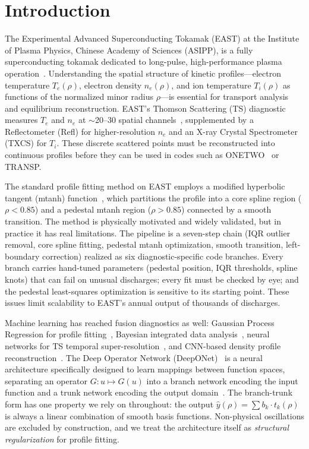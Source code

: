 \documentclass[a4paper,12pt]{article}
\begin{document}
\section{Introduction}

The Experimental Advanced Superconducting Tokamak (EAST) at the Institute of Plasma Physics, Chinese Academy of Sciences (ASIPP), is a fully superconducting tokamak dedicated to long-pulse, high-performance plasma operation~\cite{east_overview}. Understanding the spatial structure of kinetic profiles---electron temperature $T_e(\rho)$, electron density $n_e(\rho)$, and ion temperature $T_i(\rho)$ as functions of the normalized minor radius $\rho$---is essential for transport analysis and equilibrium reconstruction. EAST's Thomson Scattering (TS) diagnostic measures $T_e$ and $n_e$ at $\sim$20--30 spatial channels~\cite{east_ts,east_tvts}, supplemented by a Reflectometer (Refl) for higher-resolution $n_e$ and an X-ray Crystal Spectrometer (TXCS) for $T_i$. These discrete scattered points must be reconstructed into continuous profiles before they can be used in codes such as ONETWO~\cite{onetwo} or TRANSP.

The standard profile fitting method on EAST employs a modified hyperbolic tangent (mtanh) function~\cite{mtanh_groebner}, which partitions the profile into a core spline region ($\rho < 0.85$) and a pedestal mtanh region ($\rho > 0.85$) connected by a smooth transition. The method is physically motivated and widely validated, but in practice it has real limitations. The pipeline is a seven-step chain (IQR outlier removal, core spline fitting, pedestal mtanh optimization, smooth transition, left-boundary correction) realized as six diagnostic-specific code branches. Every branch carries hand-tuned parameters (pedestal position, IQR thresholds, spline knots) that can fail on unusual discharges; every fit must be checked by eye; and the pedestal least-squares optimization is sensitive to its starting point. These issues limit scalability to EAST's annual output of thousands of discharges.

Machine learning has reached fusion diagnostics as well: Gaussian Process Regression for profile fitting~\cite{gpr_profiles,gpr_review}, Bayesian integrated data analysis~\cite{ida_east}, neural networks for TS temporal super-resolution~\cite{diag2diag}, and CNN-based density profile reconstruction~\cite{lan_cnn_east}. The Deep Operator Network (DeepONet)~\cite{deeponet} is a neural architecture specifically designed to learn mappings between function spaces, separating an operator $G: u \mapsto G(u)$ into a branch network encoding the input function and a trunk network encoding the output domain~\cite{physics_informed_deeponet,pinn_review}. The branch-trunk form has one property we rely on throughout: the output $\hat{y}(\rho) = \sum b_k \cdot t_k(\rho)$ is always a linear combination of smooth basis functions. Non-physical oscillations are excluded by construction, and we treat the architecture itself as \textit{structural regularization} for profile fitting.
\end{document}
